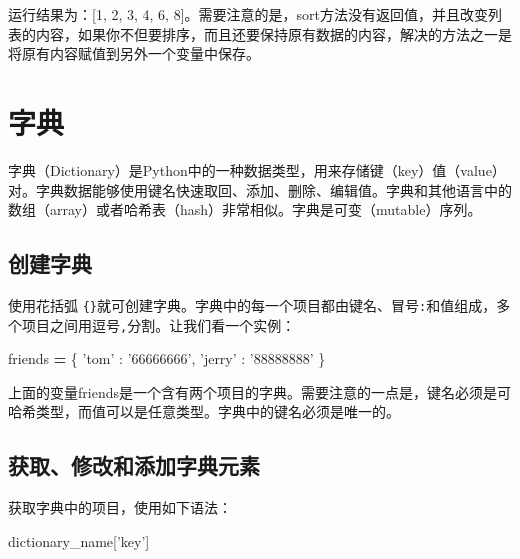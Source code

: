 \documentclass[]{ctexbook}
\newenvironment{Shaded}{\begin{snugshade}}{\end{snugshade}}
\newcommand{\NormalTok}[1]{#1}
\newcommand{\OperatorTok}[1]{\textcolor[rgb]{0.81,0.36,0.00}{\textbf{#1}}}
\newcommand{\StringTok}[1]{\textcolor[rgb]{0.31,0.60,0.02}{#1}}
\begin{document}
运行结果为：{[}1, 2, 3, 4, 6, 8{]}。需要注意的是，sort方法没有返回值，并且改变列表的内容，如果你不但要排序，而且还要保持原有数据的内容，解决的方法之一是将原有内容赋值到另外一个变量中保存。

\hypertarget{ux5b57ux5178}{%
\section{字典}\label{ux5b57ux5178}}

字典（Dictionary）是Python中的一种数据类型，用来存储键（key）值（value）对。字典数据能够使用键名快速取回、添加、删除、编辑值。字典和其他语言中的数组（array）或者哈希表（hash）非常相似。字典是可变（mutable）序列。

\hypertarget{ux521bux5efaux5b57ux5178}{%
\subsection{创建字典}\label{ux521bux5efaux5b57ux5178}}

使用花括弧 \texttt{\{\}}就可创建字典。字典中的每一个项目都由键名、冒号\texttt{:}和值组成，多个项目之间用逗号\texttt{,}分割。让我们看一个实例：

\begin{Shaded}
\begin{Highlighting}[]
\NormalTok{friends }\OperatorTok{=}\NormalTok{ \{}
\StringTok{'tom'}\NormalTok{   : }\StringTok{'66666666'}\NormalTok{,}
\StringTok{'jerry'}\NormalTok{ : }\StringTok{'88888888'}
\NormalTok{\}}
\end{Highlighting}
\end{Shaded}

上面的变量friends是一个含有两个项目的字典。需要注意的一点是，键名必须是可哈希类型，而值可以是任意类型。字典中的键名必须是唯一的。

\hypertarget{ux83b7ux53d6ux4feeux6539ux548cux6dfbux52a0ux5b57ux5178ux5143ux7d20}{%
\subsection{获取、修改和添加字典元素}\label{ux83b7ux53d6ux4feeux6539ux548cux6dfbux52a0ux5b57ux5178ux5143ux7d20}}

获取字典中的项目，使用如下语法：

\begin{Shaded}
\begin{Highlighting}[]
\NormalTok{dictionary_name[}\StringTok{'key'}\NormalTok{]}
\end{Highlighting}
\end{Shaded}
\end{document}
